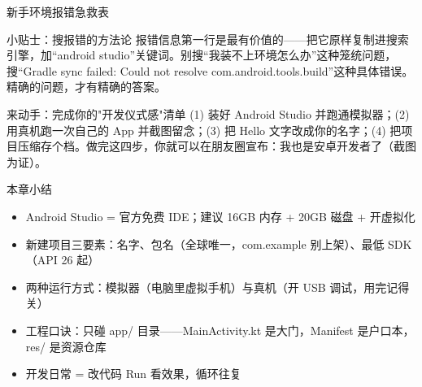 \begin{center}\small\color{gray}新手环境报错急救表\end{center}

\begin{tcbinfo}{小贴士：搜报错的方法论}
报错信息第一行是最有价值的——把它原样复制进搜索引擎，加“android studio”关键词。别搜“我装不上环境怎么办”这种笼统问题，搜“Gradle sync failed: Could not resolve com.android.tools.build”这种具体错误。精确的问题，才有精确的答案。

\end{tcbinfo}

\begin{tcbpractice}{来动手：完成你的"开发仪式感"清单}
(1) 装好 Android Studio 并跑通模拟器；(2) 用真机跑一次自己的 App 并截图留念；(3) 把 Hello 文字改成你的名字；(4) 把项目压缩存个档。做完这四步，你就可以在朋友圈宣布：我也是安卓开发者了（截图为证）。

\end{tcbpractice}

\begin{tcbsummary}{本章小结}
\begin{itemize}
  \item Android Studio = 官方免费 IDE；建议 16GB 内存 + 20GB 磁盘 + 开虚拟化
  \item 新建项目三要素：名字、包名（全球唯一，com.example 别上架）、最低 SDK（API 26 起）
  \item 两种运行方式：模拟器（电脑里虚拟手机）与真机（开 USB 调试，用完记得关）
  \item 工程口诀：只碰 app/ 目录——MainActivity.kt 是大门，Manifest 是户口本，res/ 是资源仓库
  \item 开发日常 = 改代码 Run 看效果，循环往复
\end{itemize}

\end{tcbsummary}
